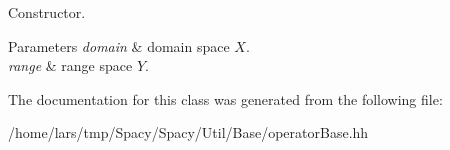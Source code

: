 Constructor. 


\begin{DoxyParams}{Parameters}
{\em domain} & domain space $X$. \\
\hline
{\em range} & range space $Y$. \\
\hline
\end{DoxyParams}


The documentation for this class was generated from the following file\+:\begin{DoxyCompactItemize}
\item 
/home/lars/tmp/\+Spacy/\+Spacy/\+Util/\+Base/operator\+Base.\+hh\end{DoxyCompactItemize}
